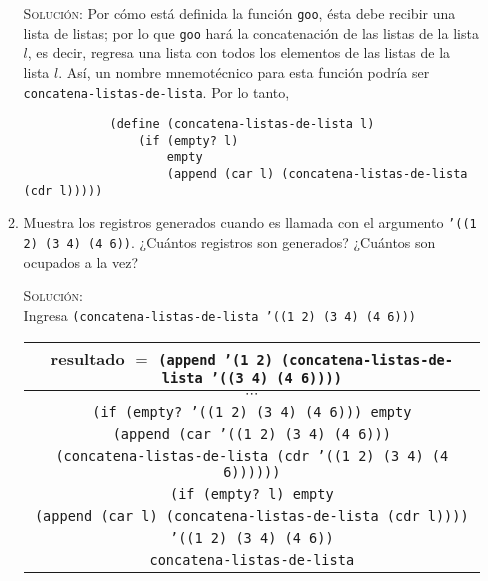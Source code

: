 \documentclass[letterpaper,11pt]{article}
\begin{document}
\begin{enumerate}
\begin{enumerate}
        \textsc{Solución:} Por cómo está definida la función \texttt{goo}, 
        ésta debe recibir una lista de listas; por lo que \texttt{goo} hará 
        la concatenación de las listas de la lista $l$, es decir, regresa una 
        lista con todos los elementos de las listas de la lista $l$. Así, un 
        nombre mnemotécnico para esta función podría ser 
        \texttt{concatena-listas-de-lista}. Por lo tanto, 
        \begin{verbatim}
            (define (concatena-listas-de-lista l)
                (if (empty? l)
                    empty
                    (append (car l) (concatena-listas-de-lista (cdr l)))))
        \end{verbatim}

        \newpage
        \item Muestra los registros generados cuando es llamada con el argumento
        \texttt{'((1 2) (3 4) (4 6))}. ¿Cuántos registros son generados? ¿Cuántos 
        son ocupados a la vez?

        \textsc{Solución:} \\
        Ingresa \texttt{(concatena-listas-de-lista '((1 2) (3 4) (4 6)))}
        \begin{center}
            \begin{tabular}{|c|}
                \hline
                resultado $=$ \texttt{(append '(1 2) 
                (concatena-listas-de-lista '((3 4) (4 6))))}  \\
                \hline
                $\cdots$ \\
                \hline
                \texttt{(if (empty? '((1 2) (3 4) (4 6))) empty} \\
                \texttt{(append (car '((1 2) (3 4) (4 6)))} \\
                \texttt{(concatena-listas-de-lista 
                (cdr '((1 2) (3 4) (4 6))))))} \\
                \hline
                \texttt{(if (empty? l) empty} \\
                \texttt{(append (car l) (concatena-listas-de-lista (cdr l))))} \\
                \hline
                \texttt{'((1 2) (3 4) (4 6))} \\
                \hline
                \texttt{concatena-listas-de-lista} \\
                \hline
            \end{tabular}
        \end{center}


\end{enumerate}
\end{enumerate}
\end{document}
